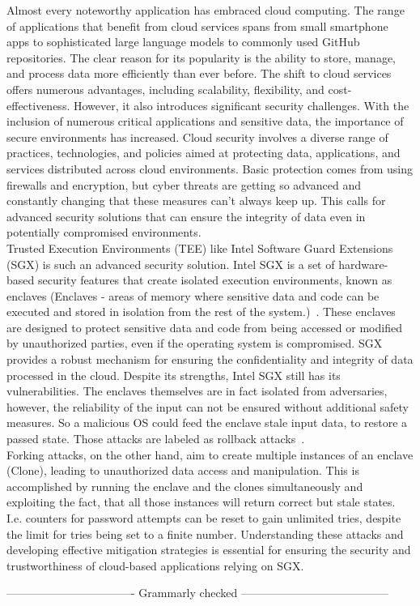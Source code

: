
Almost every noteworthy application has embraced cloud computing. The range of applications that benefit from cloud services spans from small smartphone apps to sophisticated large language models to commonly used GitHub repositories. The clear reason for its popularity is the ability to store, manage, and process data more efficiently than ever before. The shift to cloud services offers numerous advantages, including scalability, flexibility, and cost-effectiveness. However, it also introduces significant security challenges. With the inclusion of numerous critical applications and sensitive data, the importance of secure environments has increased. Cloud security involves a diverse range of practices, technologies, and policies aimed at protecting data, applications, and services distributed across cloud environments. Basic protection comes from using firewalls and encryption, but cyber threats are getting so advanced and constantly changing that these measures can't always keep up. This calls for advanced security solutions that can ensure the integrity of data even in potentially compromised environments.\\

Trusted Execution Environments (TEE) like Intel Software Guard Extensions (SGX) is such an advanced security solution. Intel SGX is a set of hardware-based security features that create isolated execution environments, known as enclaves (Enclaves -  areas of memory where sensitive data and code can be executed and stored in isolation from the rest of the system.)~\cite{nfw}. These enclaves are designed to protect sensitive data and code from being accessed or modified by unauthorized parties, even if the operating system is compromised. SGX provides a robust mechanism for ensuring the confidentiality and integrity of data processed in the cloud. Despite its strengths, Intel SGX still has its vulnerabilities. The enclaves themselves are in fact isolated from adversaries, however, the reliability of the input can not be ensured without additional safety measures. So a malicious OS could feed the enclave stale input data, to restore a passed state. Those attacks are labeled as rollback attacks~\cite{esccc}. \\
Forking attacks, on the other hand, aim to create multiple instances of an enclave (Clone), leading to unauthorized data access and manipulation. This is accomplished by running the enclave and the clones simultaneously and exploiting the fact, that all those instances will return correct but stale states. I.e. counters for password attempts can be reset to gain unlimited tries, despite the limit for tries being set to a finite number. Understanding these attacks and developing effective mitigation strategies is essential for ensuring the security and trustworthiness of cloud-based applications relying on SGX.

---------------------------------- Grammarly checked ---------------------------------------